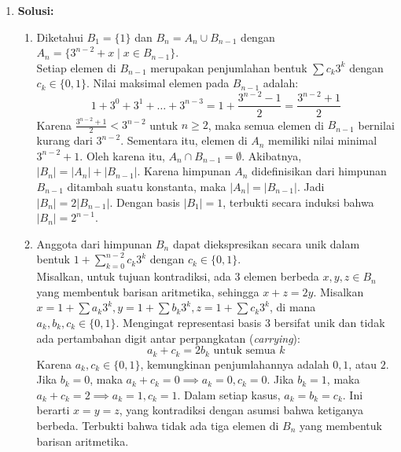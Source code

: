 \documentclass[11pt, a4paper]{article}
\begin{document}
\begin{enumerate}[leftmargin=*, label=\arabic*.]
  \item \textbf{Solusi:}
        \begin{enumerate}[label=(\alph*)]
          \item Diketahui $B_1 = \{1\}$ dan $B_n = A_n \cup B_{n-1}$ dengan $A_n = \{3^{n-2} + x \mid x \in B_{n-1}\}$.\\
                Setiap elemen di $B_{n-1}$ merupakan penjumlahan bentuk $\sum c_k 3^k$ dengan $c_k \in \{0, 1\}$.
                Nilai maksimal elemen pada $B_{n-1}$ adalah:
                \[ 1 + 3^0 + 3^1 + \dots + 3^{n-3} = 1 + \frac{3^{n-2}-1}{2} = \frac{3^{n-2}+1}{2} \]
                Karena $\frac{3^{n-2}+1}{2} < 3^{n-2}$ untuk $n \geq 2$, maka semua elemen di $B_{n-1}$ bernilai kurang dari $3^{n-2}$.
                Sementara itu, elemen di $A_n$ memiliki nilai minimal $3^{n-2} + 1$. Oleh karena itu, $A_n \cap B_{n-1} = \emptyset$.
                Akibatnya, $|B_n| = |A_n| + |B_{n-1}|$. Karena himpunan $A_n$ didefinisikan dari himpunan $B_{n-1}$ ditambah suatu konstanta, maka $|A_n| = |B_{n-1}|$.
                Jadi $|B_n| = 2|B_{n-1}|$. Dengan basis $|B_1| = 1$, terbukti secara induksi bahwa $|B_n| = 2^{n-1}$.

          \item Anggota dari himpunan $B_n$ dapat diekspresikan secara unik dalam bentuk $1 + \sum_{k=0}^{n-2} c_k 3^k$ dengan $c_k \in \{0, 1\}$. \\
                Misalkan, untuk tujuan kontradiksi, ada 3 elemen berbeda $x, y, z \in B_n$ yang membentuk barisan aritmetika, sehingga $x + z = 2y$.
                Misalkan $x = 1 + \sum a_k 3^k, y = 1 + \sum b_k 3^k, z = 1 + \sum c_k 3^k$, di mana $a_k, b_k, c_k \in \{0, 1\}$. Mengingat representasi basis 3 bersifat unik dan tidak ada pertambahan digit antar perpangkatan (\textit{carrying}):
                \[ a_k + c_k = 2b_k \text{ untuk semua } k \]
                Karena $a_k, c_k \in \{0, 1\}$, kemungkinan penjumlahannya adalah $0, 1$, atau $2$. Jika $b_k = 0$, maka $a_k + c_k = 0 \implies a_k = 0, c_k = 0$. Jika $b_k = 1$, maka $a_k + c_k = 2 \implies a_k = 1, c_k = 1$.
                Dalam setiap kasus, $a_k = b_k = c_k$. Ini berarti $x = y = z$, yang kontradiksi dengan asumsi bahwa ketiganya berbeda. Terbukti bahwa tidak ada tiga elemen di $B_n$ yang membentuk barisan aritmetika.
        \end{enumerate}


\end{enumerate}
\end{document}
